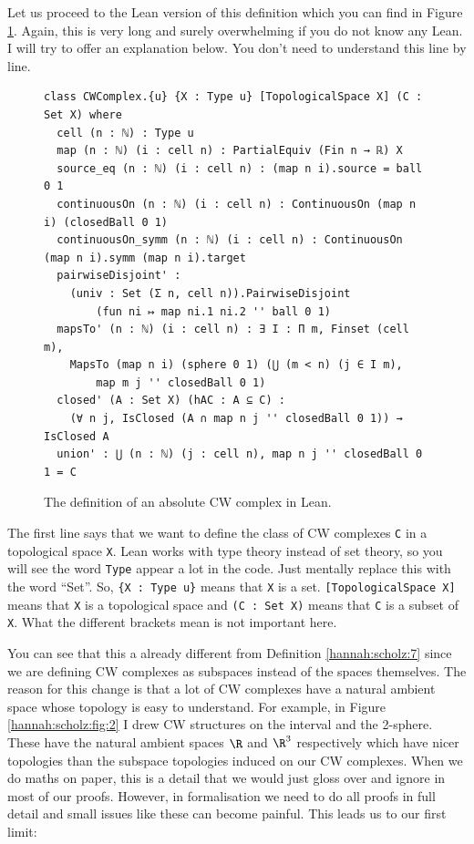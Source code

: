 Let us proceed to the Lean version of this definition which you can find in Figure \ref{hannah:scholz:fig:3}. Again, this is very long and surely overwhelming if you do not know any Lean. I will try to offer an explanation below. You don't need to understand this line by line. 

\begin{figure}[H]
\begin{lstlisting}[language=lean]
class CWComplex.{u} {X : Type u} [TopologicalSpace X] (C : Set X) where
  cell (n : ℕ) : Type u
  map (n : ℕ) (i : cell n) : PartialEquiv (Fin n → ℝ) X
  source_eq (n : ℕ) (i : cell n) : (map n i).source = ball 0 1
  continuousOn (n : ℕ) (i : cell n) : ContinuousOn (map n i) (closedBall 0 1)
  continuousOn_symm (n : ℕ) (i : cell n) : ContinuousOn (map n i).symm (map n i).target
  pairwiseDisjoint' :
    (univ : Set (Σ n, cell n)).PairwiseDisjoint 
        (fun ni ↦ map ni.1 ni.2 '' ball 0 1)
  mapsTo' (n : ℕ) (i : cell n) : ∃ I : Π m, Finset (cell m),
    MapsTo (map n i) (sphere 0 1) (⋃ (m < n) (j ∈ I m), 
        map m j '' closedBall 0 1)
  closed' (A : Set X) (hAC : A ⊆ C) :
    (∀ n j, IsClosed (A ∩ map n j '' closedBall 0 1)) → IsClosed A
  union' : ⋃ (n : ℕ) (j : cell n), map n j '' closedBall 0 1 = C
\end{lstlisting}
\caption{The definition of an absolute CW complex in Lean.}
\label{hannah:scholz:fig:3}
\end{figure}

The first line says that we want to define the class of CW complexes \lstinline[language=lean]|C| in a topological space \lstinline[language=lean]|X|. Lean works with type theory instead of set theory, so you will see the word \lstinline[language=lean]|Type| appear a lot in the code. Just mentally replace this with the word ``Set''. So, \lstinline[language=lean]|{X : Type u}| means that \lstinline[language=lean]|X| is a set. \lstinline[language=lean]|[TopologicalSpace X]| means that \lstinline[language=lean]|X| is a topological space and \lstinline[language=lean]|(C : Set X)| means that \lstinline[language=lean]|C| is a subset of \lstinline[language=lean]|X|. What the different brackets mean is not important here. 

You can see that this a already different from Definition \ref{hannah:scholz:7} since we are defining CW complexes as subspaces instead of the spaces themselves. The reason for this change is that a lot of CW complexes have a natural ambient space whose topology is easy to understand. For example, in Figure \ref{hannah:scholz:fig:2} I drew CW structures on the interval and the 2-sphere. These have the natural ambient spaces $\R$ and $\R^3$ respectively which have nicer topologies than the subspace topologies induced on our CW complexes. When we do maths on paper, this is a detail that we would just gloss over and ignore in most of our proofs. However, in formalisation we need to do all proofs in full detail and small issues like these can become painful. This leads us to our first limit: 

